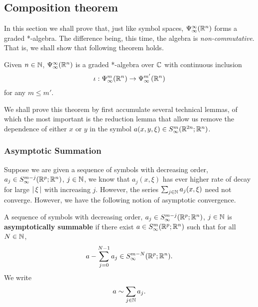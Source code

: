 \documentclass{article}
\begin{document}
\subsection{Composition theorem}

In this section we shall prove that, just like symbol spaces, $\Psi^\infty_\infty({\mathbb R}^n)$ forms a graded *-algebra. The difference being, this time, the algebra is \emph{non-commutative}. That is, we shall show that following theorem holds. 
\begin{ftheorem}[Summary] 
    Given $n \in {\ensuremath {\mathbb N}}$, $\Psi^\infty_\infty({\mathbb R}^n)$ is a graded *-algebra over ${\mathbb C}$ with continuous inclusion 
    \begin{align*}
    \iota : \Psi^m_\infty({\mathbb R}^n) \to \Psi^{m'}_\infty({\mathbb R}^n)
    \end{align*}
    for any $m \leq m'$. 
\end{ftheorem}

We shall prove this theorem by first accumulate several technical lemmas, of which the most important is the reduction lemma that allow us remove the dependence of either $x$ or $y$ in the symbol $a(x, y, \xi) \in S^{m}_\infty({\mathbb R}^{2n}; {\mathbb R}^n)$. 

\subsubsection{Asymptotic Summation}
Suppose we are given a sequence of symbols with decreasing order, $a_j \in S^{m-j}_\infty({\mathbb R}^{p}; {\mathbb R}^n)$, $j \in {\ensuremath {\mathbb N}}$, we know that  $a_j(x, \xi)$ has ever higher rate of decay for large $\left|\, \xi\,\right|$ with increasing $j$. However, the series $\sum_{j \in {\ensuremath {\mathbb N}}} a_j(x, \xi)$ need not converge. However, we have the following notion of asymptotic convergence. 
\begin{fdefinition} 
    A sequence of symbols with decreasing order, $a_j \in S^{m-j}_\infty({\mathbb R}^{p}; {\mathbb R}^n)$, $j \in {\ensuremath {\mathbb N}}$ is \textbf{asymptotically summable} if there exist $a \in S^{m}_\infty({\mathbb R}^{p}; {\mathbb R}^n)$ such that for all $N \in {\ensuremath {\mathbb N}}$, 
    \begin{align*}
    a - \sum_{j = 0}^{N -1} a_j \in S^{m-N}_\infty({\mathbb R}^{p}; {\mathbb R}^n). 
    \end{align*}
    We write
    \begin{align*}
    a \sim \sum_{j \in {\ensuremath {\mathbb N}}} a_j. 
    \end{align*}
\end{fdefinition}
 
\end{document}

